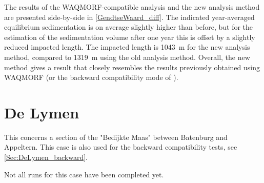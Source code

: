 The results of the WAQMORF-compatible analysis and the new analysis method are presented side-by-side in \autoref{GendtseWaard_diff}.
The indicated year-averaged equilibrium sedimentation is on average slightly higher than before, but for the estimation of the sedimentation volume after one year this is offset by a slightly reduced impacted length.
The impacted length is \SI{1043}{\metre} for the new analysis method, compared to \SI{1319}{\metre} using the old analysis method.
Overall, the new method gives a result that closely resembles the results previously obtained using WAQMORF (or the backward compatibility mode of \dfmi).

\section{De Lymen}\label{Sec:DeLymen}
This concerns a section of the "Bedijkte Maas" between Batenburg and Appeltern.
This case is also used for the backward compatibility tests, see \autoref{Sec:DeLymen_backward}.

Not all runs for this case have been completed yet.


